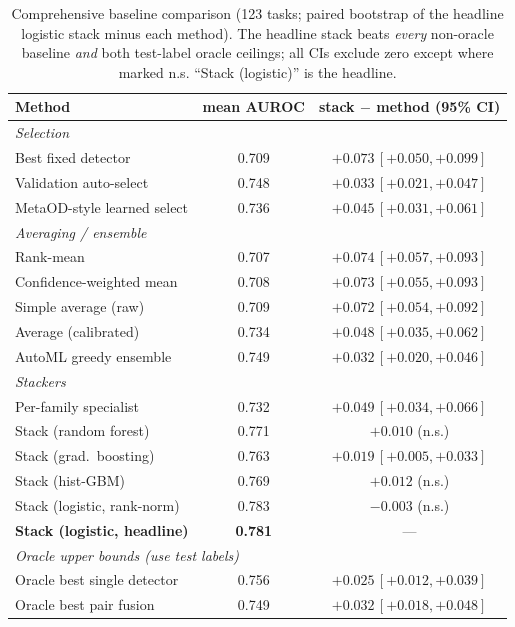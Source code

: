 \documentclass[10pt,conference]{IEEEtran}
\begin{document}
\begin{table}[t]\centering
\caption{Comprehensive baseline comparison (123 tasks; paired bootstrap of the
headline logistic stack minus each method). The headline stack beats \emph{every}
non-oracle baseline \emph{and} both test-label oracle ceilings; all CIs exclude zero
except where marked n.s. ``Stack (logistic)'' is the headline.}
\label{tab:baselines}\footnotesize
\begin{tabular}{lcc}
\toprule
\textbf{Method} & mean AUROC & stack $-$ method (95\% CI) \\
\midrule
\multicolumn{3}{l}{\emph{Selection}}\\
Best fixed detector & 0.709 & $+0.073\,[+0.050,+0.099]$ \\
Validation auto-select & 0.748 & $+0.033\,[+0.021,+0.047]$ \\
MetaOD-style learned select & 0.736 & $+0.045\,[+0.031,+0.061]$ \\
\midrule
\multicolumn{3}{l}{\emph{Averaging / ensemble}}\\
Rank-mean & 0.707 & $+0.074\,[+0.057,+0.093]$ \\
Confidence-weighted mean & 0.708 & $+0.073\,[+0.055,+0.093]$ \\
Simple average (raw) & 0.709 & $+0.072\,[+0.054,+0.092]$ \\
Average (calibrated) & 0.734 & $+0.048\,[+0.035,+0.062]$ \\
AutoML greedy ensemble & 0.749 & $+0.032\,[+0.020,+0.046]$ \\
\midrule
\multicolumn{3}{l}{\emph{Stackers}}\\
Per-family specialist & 0.732 & $+0.049\,[+0.034,+0.066]$ \\
Stack (random forest) & 0.771 & $+0.010$ (n.s.) \\
Stack (grad.\ boosting) & 0.763 & $+0.019\,[+0.005,+0.033]$ \\
Stack (hist-GBM) & 0.769 & $+0.012$ (n.s.) \\
Stack (logistic, rank-norm) & 0.783 & $-0.003$ (n.s.) \\
\textbf{Stack (logistic, headline)} & \textbf{0.781} & --- \\
\midrule
\multicolumn{3}{l}{\emph{Oracle upper bounds (use test labels)}}\\
Oracle best single detector & 0.756 & $+0.025\,[+0.012,+0.039]$ \\
Oracle best pair fusion & 0.749 & $+0.032\,[+0.018,+0.048]$ \\
\bottomrule
\end{tabular}
\end{table}
\end{document}
